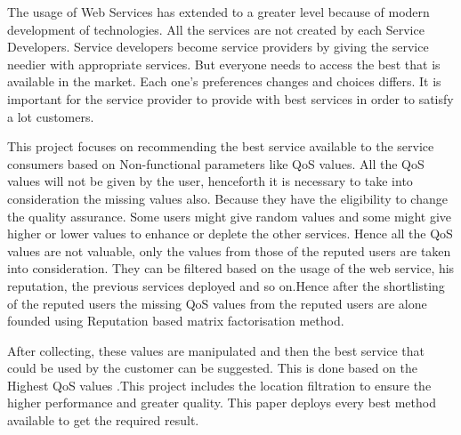 The usage of Web Services has extended to a greater level because of modern development of technologies. All the services are not created by each Service Developers. Service developers become service providers by giving the service needier with appropriate services. But everyone needs to access the best that is available in the market. Each one’s preferences changes and choices differs. It is important for the service provider to provide with best services in order to satisfy a lot customers.

This project focuses on recommending the best service available to the service consumers based on Non-functional parameters like QoS values. All the QoS values will not be given by the user, henceforth it is necessary to take into consideration the missing values also. Because they have the eligibility to change the quality assurance. Some users might give random values and some might give higher or lower values to enhance or deplete the other services. Hence all the QoS values are not valuable, only the values from those of the reputed users are taken into consideration. They can be filtered based on the usage of the web service, his reputation, the previous services deployed and so on.Hence after the shortlisting of the reputed users the missing QoS values from the reputed users are alone founded using Reputation based matrix factorisation method.

After collecting, these values are manipulated and then the best service that could be used by the customer can be suggested. This is done based on the Highest QoS values .This project includes the location filtration to ensure the higher performance and greater quality. This paper deploys every best method available to get the required result. 

